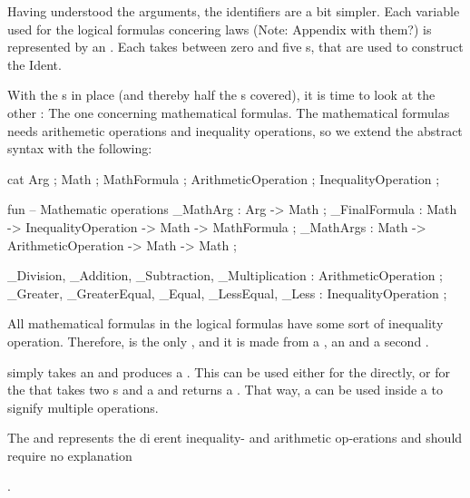 Having understood the arguments, the identifiers are a bit simpler. Each variable used for the logical formulas concering laws (Note: Appendix with them?) is represented by an . Each  takes between zero and five s, that are used to construct the Ident.

With the s in place (and thereby half the s covered),  it is time to look at the other : The one concerning mathematical formulas. The mathematical formulas needs arithemetic operations and inequality operations, so we extend the abstract syntax with the following:

\begin{lstgf}
    cat
        Arg ; Math ; MathFormula ; ArithmeticOperation ; InequalityOperation ;

    fun
        -- Mathematic operations
        _MathArg : Arg -> Math ;
        _FinalFormula : Math -> InequalityOperation -> Math -> MathFormula ;
        _MathArgs : Math -> ArithmeticOperation -> Math -> Math ;

        _Division, _Addition, _Subtraction, _Multiplication : ArithmeticOperation ;
        _Greater, _GreaterEqual, _Equal, _LessEqual, _Less : InequalityOperation ;
\end{lstgf}

All mathematical formulas in the logical formulas have some sort of inequality operation. Therefore,  is the only , and it is made from a , an  and a second .

 simply takes an  and produces a . This can be used either for the  directly, or for the  that takes two s and a  and returns a . That way, a  can be used inside a  to signify multiple operations.

The  and  represents the dierent inequality- and arithmetic op-erations and should require no explanation

.